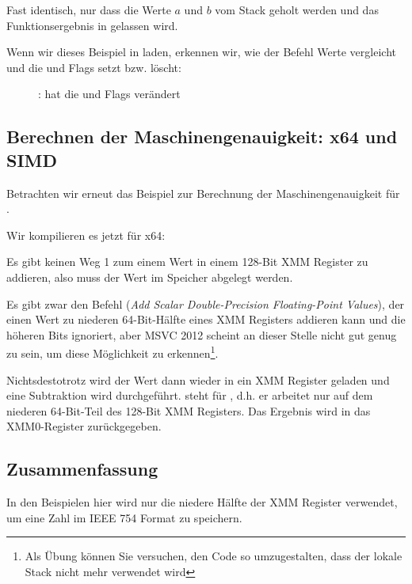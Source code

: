 
Fast identisch, nur dass die Werte $a$ und $b$ vom Stack geholt werden und das Funktionsergebnis in  gelassen
wird.

Wenn wir dieses Beispiel in \olly laden, erkennen wir, wie der Befehl  Werte vergleicht und die \CF und \PF
Flags setzt bzw. löscht:

\begin{figure}[H]
\centering
{}
\caption{\olly:  hat die \CF und \PF Flags verändert}
\label{fig:FPU_SIMD_d_max_olly}
\end{figure}

\subsection{Berechnen der Maschinengenauigkeit: x64 und SIMD}
\label{machine_epsilon_x64_and_SIMD}
Betrachten wir erneut das Beispiel zur Berechnung der Maschinengenauigkeit für \Tdouble
{}.

Wir kompilieren es jetzt für x64:


Es gibt keinen Weg 1 zum einem Wert in einem 128-Bit XMM Register zu addieren, also muss der Wert im Speicher abgelegt
werden.

Es gibt zwar den Befehl  (\emph{Add Scalar Double-Precision Floating-Point Values}), der einen Wert zu niederen
64-Bit-Hälfte eines XMM Registers addieren kann und die höheren Bits ignoriert, aber MSVC 2012 scheint an dieser Stelle
nicht gut genug zu sein, um diese Möglichkeit zu erkennen\footnote{Als Übung können Sie versuchen, den Code so
umzugestalten, dass der lokale Stack nicht mehr verwendet wird}.

Nichtsdestotrotz wird der Wert dann wieder in ein XMM Register geladen und eine Subtraktion wird durchgeführt.
 steht für , d.h. er arbeitet nur auf dem niederen
64-Bit-Teil des 128-Bit XMM Registers.
Das Ergebnis wird in das XMM0-Register zurückgegeben.



\subsection{Zusammenfassung}
In den Beispielen hier wird nur die niedere Hälfte der XMM Register verwendet, um eine Zahl im IEEE 754 Format zu
speichern.

